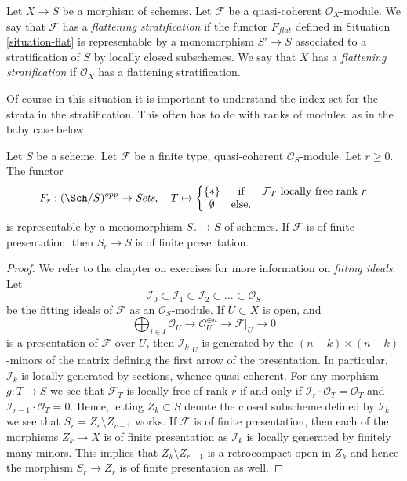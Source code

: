 \begin{definition}
\label{definition-flattening-stratification}
Let $X \to S$ be a morphism of schemes.
Let $\mathcal{F}$ be a quasi-coherent $\mathcal{O}_X$-module.
We say that $\mathcal{F}$ has a {\it flattening stratification}
if the functor $F_{flat}$ defined in Situation \ref{situation-flat}
is representable by a monomorphism $S' \to S$ associated
to a stratification of $S$ by locally closed subschemes.
We say that $X$ has a {\it flattening stratification}
if $\mathcal{O}_X$ has a flattening stratification.
\end{definition}

\noindent
Of course in this situation it is important to understand the index
set for the strata in the stratification. This often has to do with
ranks of modules, as in the baby case below.

\begin{lemma}
\label{lemma-locally-free-rank-r-pullback}
Let $S$ be a scheme. Let $\mathcal{F}$ be a finite type, quasi-coherent
$\mathcal{O}_S$-module. Let $r \geq 0$. The functor
$$
F_r : (\Sch/S)^{opp} \to \textit{Sets}, \quad
T \mapsto
\left\{
\begin{matrix}
\{*\} & \text{if} & \mathcal{F}_T\text{ locally free rank }r\\
\emptyset & \text{else.} &
\end{matrix}
\right.
$$
is representable by a monomorphism $S_r \to S$ of schemes. If $\mathcal{F}$
is of finite presentation, then $S_r \to S$ is of finite presentation.
\end{lemma}

\begin{proof}
We refer to the chapter on exercises for more information on
{\it fitting ideals}. Let
$$
\mathcal{I}_0 \subset \mathcal{I}_1 \subset \mathcal{I}_2 \subset
\ldots \subset \mathcal{O}_S
$$
be the fitting ideals of $\mathcal{F}$ as an $\mathcal{O}_S$-module.
If $U \subset X$ is open, and
$$
\bigoplus\nolimits_{i \in I} \mathcal{O}_U \to
\mathcal{O}_U^{\oplus n} \to \mathcal{F}|_U \to 0
$$
is a presentation of $\mathcal{F}$ over $U$, then
$\mathcal{I}_k|_U$ is generated by the $(n - k) \times (n - k)$-minors
of the matrix defining the first arrow of the presentation.
In particular, $\mathcal{I}_k$
is locally generated by sections, whence quasi-coherent.
For any morphism $g : T \to S$ we see that $\mathcal{F}_T$ is locally
free of rank $r$ if and only if
$\mathcal{I}_r \cdot \mathcal{O}_T = \mathcal{O}_T$ and
$\mathcal{I}_{r - 1} \cdot \mathcal{O}_T = 0$.
Hence, letting $Z_k \subset S$ denote the closed subscheme defined by
$\mathcal{I}_k$ we see that $S_r = Z_r \setminus Z_{r - 1}$ works.
If $\mathcal{F}$ is of finite presentation, then each of the morphisms
$Z_k \to X$ is of finite presentation as $\mathcal{I}_k$ is locally
generated by finitely many minors. This implies that
$Z_k \setminus Z_{r - 1}$ is a retrocompact open in $Z_k$
and hence the morphism $S_r \to Z_r$ is of finite presentation as
well.
\end{proof}


